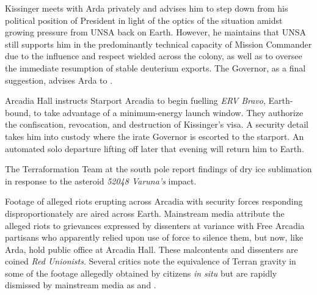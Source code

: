 Kissinger meets with Arda privately and advises him to step down from his political position of President in light of the optics of the situation amidst growing pressure from UNSA back on Earth. However, he maintains that UNSA still supports him in the predominantly technical capacity of Mission Commander due to the influence and respect wielded across the colony, as well as to oversee the immediate resumption of stable deuterium exports. The Governor, as a final suggestion, advises Arda to .
\StopTimelineDate

Arcadia Hall instructs Starport Arcadia to begin fuelling {\it ERV Bravo}, Earth-bound, to take advantage of a minimum-energy launch window. They authorize the confiscation, revocation, and destruction of Kissinger's visa. A security detail takes him into custody where the irate Governor is escorted to the starport. An automated solo departure lifting off later that evening will return him to Earth.
\StopTimelineDate

The Terraformation Team at the south pole report findings of dry ice sublimation in response to the asteroid {\it 52048 Varuna's} impact.
\StopTimelineDate

Footage of alleged riots erupting across Arcadia with security forces responding disproportionately are aired across Earth. Mainstream media attribute the alleged riots to grievances expressed by dissenters at variance with Free Arcadia partisans who apparently relied upon use of force to silence them, but now, like Arda, hold public office at Arcadia Hall. These malcontents and dissenters are coined {\it Red Unionists}. Several critics note the equivalence of Terran gravity in some of the footage allegedly obtained by citizens {\it in situ} but are rapidly dismissed by mainstream media as  and .
\StopTimelineDate

